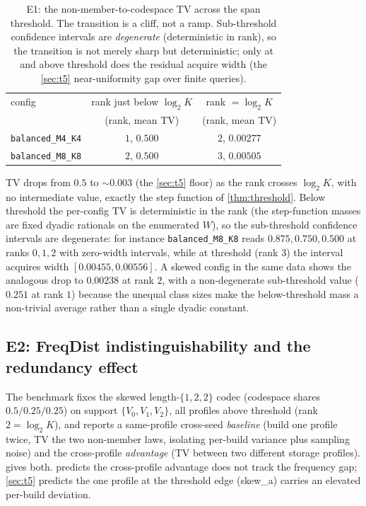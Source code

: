 \documentclass[acmsmall,review]{acmart}
\newcommand{\W}{W}                          %
\begin{document}
\begin{table}[t]
  \centering
  \caption{E1: the non-member-to-codespace TV across the span threshold. The transition
  is a cliff, not a ramp. Sub-threshold confidence intervals are \emph{degenerate}
  (deterministic in rank), so the transition is not merely sharp but deterministic; only
  at and above threshold does the residual acquire width (the \cref{sec:t5} near-uniformity
  gap over finite queries).}
  \label{tab:e1}
  \begin{tabular}{lcc}
    \toprule
    config & rank just below $\log_2 K$ & rank $= \log_2 K$ \\
           & (rank, mean TV) & (rank, mean TV) \\
    \midrule
    \texttt{balanced\_M4\_K4} & $1$, \quad $0.500$ & $2$, \quad $0.00277$ \\
    \texttt{balanced\_M8\_K8} & $2$, \quad $0.500$ & $3$, \quad $0.00505$ \\
    \bottomrule
  \end{tabular}
\end{table}

TV drops from $0.5$ to $\sim 0.003$ (the \cref{sec:t5} floor) as the rank crosses
$\log_2 K$, with no intermediate value, exactly the step function of \cref{thm:threshold}.
Below threshold the per-config TV is deterministic in the rank (the step-function masses
are fixed dyadic rationals on the enumerated $\W$), so the sub-threshold confidence
intervals are degenerate: for instance \texttt{balanced\_M8\_K8} reads $0.875, 0.750,
0.500$ at ranks $0, 1, 2$ with zero-width intervals, while at threshold (rank $3$) the
interval acquires width $[0.00455, 0.00556]$. A skewed config in the same data shows the
analogous drop to $0.00238$ at rank $2$, with a non-degenerate sub-threshold value
($0.251$ at rank $1$) because the unequal class sizes make the below-threshold mass a
non-trivial average rather than a single dyadic constant.

\subsection{E2: FreqDist indistinguishability and the redundancy effect}

The benchmark fixes the skewed length-$\{1,2,2\}$ codec (codespace shares
$0.5/0.25/0.25$) on support $\{V_0, V_1, V_2\}$, all profiles above threshold (rank
$2 = \log_2 K$), and reports a same-profile cross-seed \emph{baseline} (build one profile
twice, TV the two non-member laws, isolating per-build variance plus sampling noise) and
the cross-profile \emph{advantage} (TV between two different storage profiles).
 gives both.  predicts the cross-profile advantage does
not track the frequency gap; \cref{sec:t5} predicts the one profile at the threshold edge
(skew\_a) carries an elevated per-build deviation.
\end{document}
